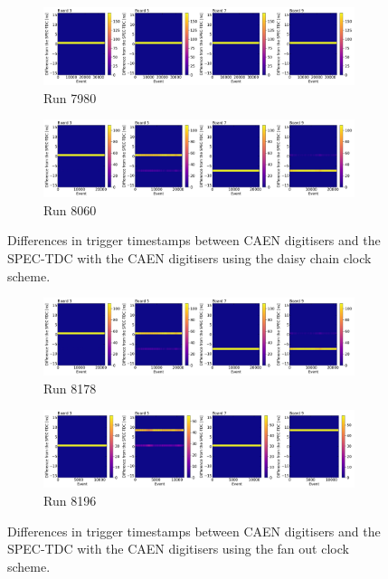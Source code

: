 \begin{figure}[htbp!]
\begin{subfigure}[h]{1.00\linewidth}
\centering    
\includegraphics[width=\linewidth]{TTT_SPEC_diff_run7980}
\caption{Run 7980}
\label{fig:run7980}
\end{subfigure}
\begin{subfigure}[h]{1.00\linewidth}
\centering    
\includegraphics[width=\linewidth]{TTT_SPEC_diff_run8060}
\caption{Run 8060}
\label{fig:run8060}
\end{subfigure}%
\caption[Variation of CAEN Timestamps Using the Daisy Chain Clock Scheme]{
Differences in trigger timestamps between CAEN digitisers and the SPEC-TDC with the CAEN digitisers using the daisy chain clock scheme.
}
\label{fig:daisychainSPEC}
\vspace{0.5cm}
\begin{subfigure}[h]{1.00\linewidth}
\centering    
\includegraphics[width=\linewidth]{TTT_SPEC_diff_run8178}
\caption{Run 8178}
\end{subfigure}
\begin{subfigure}[h]{1.00\linewidth}
\centering    
\includegraphics[width=\linewidth]{TTT_SPEC_diff_run8196}
\caption{Run 8196}
\end{subfigure}%
\caption[Variation of CAEN Timestamps Using the Fan Out Clock Scheme]{
Differences in trigger timestamps between CAEN digitisers and the SPEC-TDC with the CAEN digitisers using the fan out clock scheme.
}
\label{fig:fanoutSPEC}
\end{figure}

